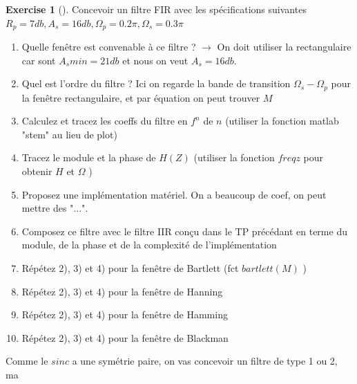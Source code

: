 \documentclass{article}
\theoremstyle{plain}%
\theoremstyle{definition}
\newtheorem{xca}[exmp]{Exercise}
\theoremstyle{remark}
\begin{document}
\begin{xca}[]
    Concevoir un filtre FIR avec les spécifications suivantes $ R_p = 7db, A_s = 16db, \Omega _p = 0.2 \pi, \Omega _s = 0.3 \pi $ 
    \begin{enumerate}
        \item Quelle fenêtre est convenable à ce filtre ? $\rightarrow$ On doit utiliser la rectangulaire car sont $ A_s min = 21db$ et nous on veut $ A_s = 16 db $. 
        \item Quel est l'ordre du filtre ? Ici on regarde la bande de transition $ \Omega _s - \Omega _p $ pour la fenêtre rectangulaire, et par équation on peut trouver $ M $ 
        \item Calculez et tracez les coeffs du filtre en $ f^n $ de $ n $ (utiliser la fonction matlab "stem" au lieu de plot)
        \item Tracez le module et la phase de $ H(Z) $ (utiliser la fonction $ freqz $ pour obtenir $ H $ et $ \Omega  $ )
        \item Proposez une implémentation matériel. On a beaucoup de coef, on peut mettre des "...". 
        \item Composez ce filtre avec le filtre IIR conçu dans le TP précédant en terme du module, de la phase et de la complexité de l'implémentation
        \item Répétez 2), 3) et 4) pour la fenêtre de Bartlett (fct $ bartlett(M) $ )
        \item Répétez 2), 3) et 4) pour la fenêtre de Hanning
        \item Répétez 2), 3) et 4) pour la fenêtre de Hamming
        \item Répétez 2), 3) et 4) pour la fenêtre de Blackman
    \end{enumerate}
\end{xca}

Comme le $ sinc $ a une symétrie paire, on vas concevoir un filtre de type 1 ou 2, ma
\end{document}
